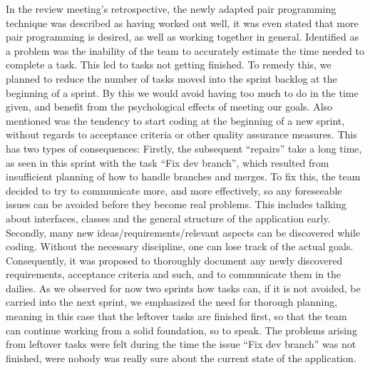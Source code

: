 In the review meeting’s retrospective, the newly adapted pair programming technique was described as having worked out well, it was even stated that more pair programming is desired, as well as working together in general. Identified as a problem was the inability of the team to accurately estimate the time needed to complete a task. This led to tasks not getting finished. To remedy this, we planned to reduce the number of tasks moved into the sprint backlog at the beginning of a sprint. By this we would avoid having too much to do in the time given, and benefit from the psychological effects of meeting our goals. Also mentioned was the tendency to start coding at the beginning of a new sprint, without regards to acceptance criteria or other quality assurance measures. This has two types of consequences: Firstly, the subsequent “repairs” take a long time, as seen in this sprint with the task “Fix dev branch”, which resulted from insufficient planning of how to handle branches and merges. To fix this, the team decided to try to communicate more, and more effectively, so any foreseeable issues can be avoided before they become real problems. This includes talking about interfaces, classes and the general structure of the application early. Secondly, many new ideas/requirements/relevant aspects can be discovered while coding. Without the necessary discipline, one can lose track of the actual goals. Consequently, it was proposed to thoroughly document any newly discovered requirements, acceptance criteria and such, and to communicate them in the dailies. As we observed for now two sprints how tasks can, if it is not avoided, be carried into the next sprint, we emphasized the need for thorough planning, meaning in this case that the leftover tasks are finished first, so that the team can continue working from a solid foundation, so to speak. The problems arising from leftover tasks were felt during the time the issue “Fix dev branch” was not finished, were nobody was really sure about the current state of the application.
